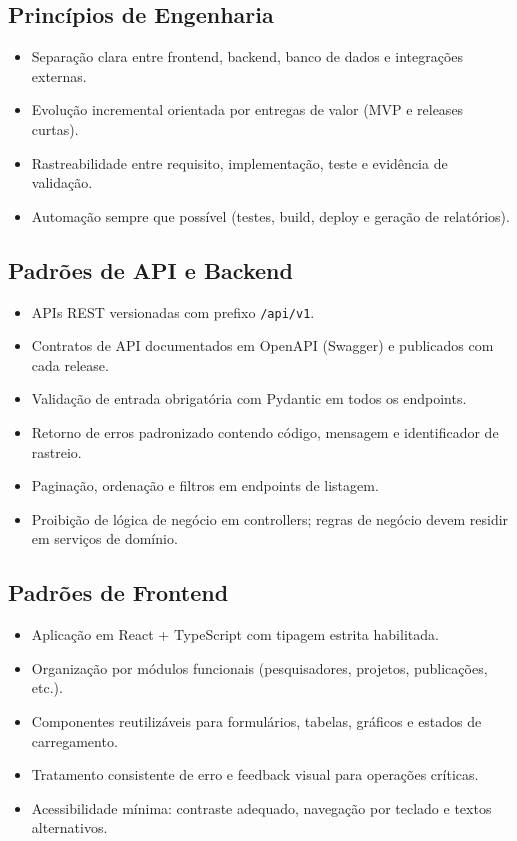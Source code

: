 \documentclass[12pt,a4paper]{article}
\begin{document}
\subsection{Princípios de Engenharia}
\begin{itemize}[leftmargin=*]
  \item Separação clara entre frontend, backend, banco de dados e integrações externas.
  \item Evolução incremental orientada por entregas de valor (MVP e releases curtas).
  \item Rastreabilidade entre requisito, implementação, teste e evidência de validação.
  \item Automação sempre que possível (testes, build, deploy e geração de relatórios).
\end{itemize}

\subsection{Padrões de API e Backend}
\begin{itemize}[leftmargin=*]
  \item APIs REST versionadas com prefixo \texttt{/api/v1}.
  \item Contratos de API documentados em OpenAPI (Swagger) e publicados com cada release.
  \item Validação de entrada obrigatória com Pydantic em todos os endpoints.
  \item Retorno de erros padronizado contendo código, mensagem e identificador de rastreio.
  \item Paginação, ordenação e filtros em endpoints de listagem.
  \item Proibição de lógica de negócio em controllers; regras de negócio devem residir em serviços de domínio.
\end{itemize}

\subsection{Padrões de Frontend}
\begin{itemize}[leftmargin=*]
  \item Aplicação em React + TypeScript com tipagem estrita habilitada.
  \item Organização por módulos funcionais (pesquisadores, projetos, publicações, etc.).
  \item Componentes reutilizáveis para formulários, tabelas, gráficos e estados de carregamento.
  \item Tratamento consistente de erro e feedback visual para operações críticas.
  \item Acessibilidade mínima: contraste adequado, navegação por teclado e textos alternativos.
\end{itemize}
\end{document}
